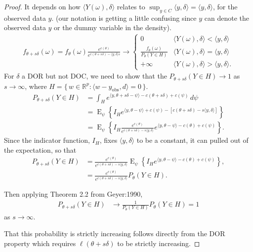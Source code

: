 \documentclass{amsbook}
\DeclareMathOperator{\E}{E}
\def\RR{{\mathbb R}}
\newcommand{\yobs}{y_{\textrm{obs}}}
\newcommand{\set}[1]{\{\,#1\,\}}
\newcommand{\inner}[1]{\langle #1 \rangle}
\theoremstyle{definition}
\theoremstyle{remark}
\begin{document}
\begin{proof}
It depends on how $\inner{Y(\omega),\delta}$ relates to $\sup_{y \in C}\inner{y,
\delta} = \inner{y,\delta}$, for the observed data $y$.  (our notation is getting a 
little confusing since $y$ can denote the observed data $y$ or the dummy variable in 
the density).  
\begin{align*}
	f_{\theta+s\delta}(\omega) = f_\theta(\omega) \frac{e^{c(\theta)}}{e^{ c(\theta+s
\delta) - \inner{y,\delta}s } } 
	\to	
			\begin{cases} 
			0 								& \inner{Y(\omega),\delta} < \inner{y,
\delta} \\
			\frac{f_\theta(\omega)}{P_\theta(Y \in H)} 	& \inner{Y(\omega) ,
\delta} = \inner{y,\delta} \\
			+\infty							& \inner{Y(\omega),\delta} > \inner{y,
\delta}.
	\end{cases}
\end{align*}
For $\delta$ a DOR but not DOC, we need to show that the $P_{\theta+s\delta}(Y \in H) 
\to 1$ 
as $s \to \infty$, where $H = \set{w \in \RR^p: \inner{w-\yobs,d}=0}$.
\begin{align*}
 P_{\theta+s\delta}(Y \in H) &= \int_H e^{\inner{y, \theta+s\delta - \psi} - c(\theta
+s\delta) + c(\psi)} \, d\psi \\
		&= \E_\psi \left \{ I_H e^{\inner{y, \theta - \psi} +c(\psi) - [c(\theta+s
\delta) -s\inner{y,\delta}]} \right 
\}\\
		&= \E_\psi \left \{ I_H  \frac{e^{c(\theta)} }{ e^{ c(\theta+s\delta) -s\inner
{y,\delta} } } 
		e^{\inner{y, \theta - \psi} -c(\theta)+c(\psi)}  \right \}.
\end{align*}
Since the indicator function, $I_H$, fixes $\inner{ y, \delta}$ to be a constant, it 
can pulled out of the expectation, so that 
\begin{align*}
		 P_{\theta+s\delta}(Y \in H)
		 &= \frac{e^{c(\theta)} }{ e^{ c(\theta+s\delta) -s\inner{y,\delta} } }
		 \E_\psi \left \{ I_H   
		e^{\inner{y, \theta - \psi} -c(\theta)+c(\psi)}  \right \}, \\
		 &= \frac{e^{c(\theta)} }{ e^{ c(\theta+s\delta) -s\inner{y,\delta} } } 
		 P_\theta ( Y \in H ).
		 \end{align*}
 
Then applying Theorem 2.2 from Geyer:1990,
\begin{align*}
 P_{\theta+s\delta}(Y \in H)
		&\to \frac{1}{P_\theta(Y \in H)}  P_{\theta}(Y \in H) = 1
 \end{align*}
 as $s \to \infty$.  
 
 That this probability is strictly increasing follows directly from the DOR property 
which requires $\ell( \theta+s
\delta)$ to be strictly increasing.   
\end{proof}
\end{document}
